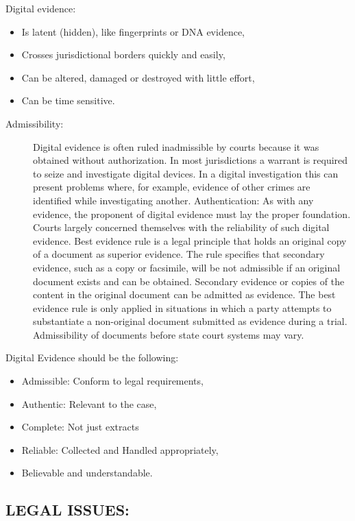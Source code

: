 \documentclass[10pt,british,english]{article}
\begin{document}
Digital evidence: 
\begin{itemize}
\item Is latent (hidden), like fingerprints or DNA evidence,
\item Crosses jurisdictional borders quickly and easily,
\item Can be altered, damaged or destroyed with little effort,
\item Can be time sensitive.
\end{itemize}
\begin{description}
\item [{Admissibility:}] Digital evidence is often ruled inadmissible by
courts because it was obtained without authorization. In most jurisdictions
a warrant is required to seize and investigate digital devices. In
a digital investigation this can present problems where, for example,
evidence of other crimes are identified while investigating another.
Authentication: As with any evidence, the proponent of digital evidence
must lay the proper foundation. Courts largely concerned themselves
with the reliability of such digital evidence. Best evidence rule
is a legal principle that holds an original copy of a document as
superior evidence. The rule specifies that secondary evidence, such
as a copy or facsimile, will be not admissible if an original document
exists and can be obtained. \textquotedbl Secondary evidence\textquotedbl{}
or copies of the content in the original document can be admitted
as evidence. The best evidence rule is only applied in situations
in which a party attempts to substantiate a non-original document
submitted as evidence during a trial. Admissibility of documents before
state court systems may vary. 
\end{description}
Digital Evidence should be the following:
\begin{itemize}
\item Admissible: Conform to legal requirements,
\item Authentic: Relevant to the case,
\item Complete: Not just extracts
\item Reliable: Collected and Handled appropriately,
\item Believable and understandable.
\end{itemize}

\subsection{LEGAL ISSUES:}
\end{document}
